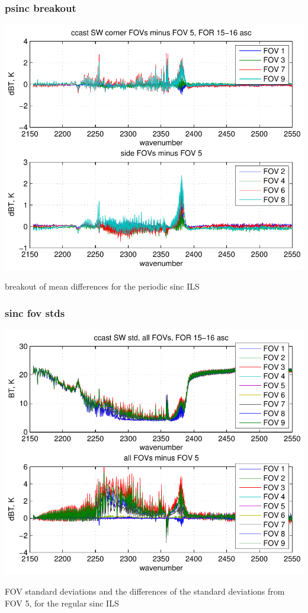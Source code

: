 \documentclass[11pt]{beamer}
\begin{document}
\begin{frame}
\frametitle{psinc breakout}

\begin{center}
  \includegraphics[scale=0.6]{figures/hr2_dif_p.pdf}
\end{center}

breakout of mean differences for the periodic sinc ILS

\end{frame}
\begin{frame}
\frametitle{sinc fov stds}

\begin{center}
  \includegraphics[scale=0.6]{figures/hr2_std_s.pdf}
\end{center}

FOV standard deviations and the differences of the standard
deviations from FOV 5, for the regular sinc ILS

\end{frame}
\end{document}

